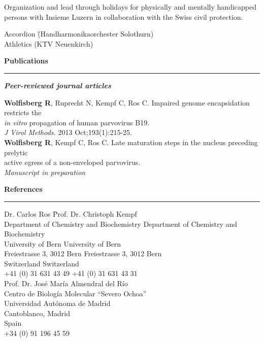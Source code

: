 Organization and lead through holidays for physically and mentally handicapped persons with Insieme Luzern in collaboration with the Swiss civil protection. \\[0.15 cm]
\begin{tabbing}
Accordion \=(Handharmonikaorchester Solothurn) \\[0.15 cm]
Athletics \>(KTV Neuenkirch) 
\end{tabbing}



\vspace{0.5 cm}
\Large
\textbf{Publications}
\noindent\rule[0mm]{\linewidth}{2pt}

\normalsize

\vspace{0.3 cm}
\textbf{\emph{Peer-reviewed journal articles}} \\[0.3 cm]

\begin{addmargin}{0.025\textwidth}
\textbf{Wolfisberg R}, Ruprecht N, Kempf C, Ros C. Impaired genome encapsidation
restricts the \\
\textit{in vitro} propagation of human parvovirus B19. \\
\textit{J Virol Methods.} 2013 Oct;193(1):215-25. \\[0.3 cm]

\textbf{Wolfisberg R}, Kempf C, Ros C. Late maturation steps in the nucleus preceding prelytic\\
 active egress of a non-enveloped parvovirus.\\ 
 \textit{Manuscript in preparation}
\end{addmargin}

\vspace{0.5 cm}
\Large
\textbf{References}
\noindent\rule[0mm]{\linewidth}{2pt}

\normalsize

\begin{tabbing}

Dr. Carlos Ros \hspace{5.5 cm} \= Prof. Dr. Christoph Kempf \hspace{1 cm}  \\
Department of Chemistry and Biochemistry \> Department of Chemistry and Biochemistry \\
University of Bern \> University of Bern \\
Freiestrasse 3, 3012 Bern \> Freiestrasse 3, 3012 Bern \\
Switzerland \> Switzerland \\ [0.1 cm]
+41 (0) 31 631 43 49 \> +41 (0) 31 631 43 31 \\ [0.5 cm]

Prof. Dr. José María Almendral del Río \\
Centro de Biología Molecular ``Severo Ochoa'' \\
Universidad Autónoma de Madrid \\
Cantoblanco,  Madrid \\
Spain \\[0.1 cm]
+34 (0) 91 196 45 59
 

\end{tabbing}